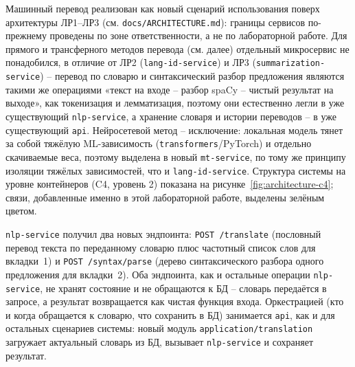 

Машинный перевод реализован как новый сценарий использования поверх
архитектуры ЛР1--ЛР3 (см. \texttt{docs/ARCHITECTURE.md}): границы
сервисов по-прежнему проведены по зоне ответственности, а не по
лабораторной работе. Для прямого и трансферного методов перевода (см.
далее) отдельный микросервис не понадобился, в отличие от ЛР2
(\texttt{lang-id-service}) и ЛР3 (\texttt{summarization-service}) --
перевод по словарю и синтаксический разбор предложения являются такими
же операциями «текст на входе -- разбор spaCy -- чистый результат на
выходе», как токенизация и лемматизация, поэтому они естественно легли
в уже существующий \texttt{nlp-service}, а хранение словаря и истории
переводов -- в уже существующий \texttt{api}. Нейросетевой метод --
исключение: локальная модель тянет за собой тяжёлую ML-зависимость
(\texttt{transformers}/PyTorch) и отдельно скачиваемые веса, поэтому
выделена в новый \texttt{mt-service}, по тому же принципу изоляции
тяжёлых зависимостей, что и \texttt{lang-id-service}. Структура системы
на уровне контейнеров (C4, уровень 2) показана на
рисунке~\ref{fig:architecture-c4}; связи, добавленные именно в этой
лабораторной работе, выделены зелёным цветом.


\texttt{nlp-service} получил два новых эндпоинта: \texttt{POST
/translate} (пословный перевод текста по переданному словарю плюс
частотный список слов для вкладки~1) и \texttt{POST /syntax/parse}
(дерево синтаксического разбора одного предложения для вкладки~2).
Оба эндпоинта, как и остальные операции \texttt{nlp-service}, не
хранят состояние и не обращаются к БД -- словарь передаётся в запросе,
а результат возвращается как чистая функция входа. Оркестрацией (кто
и когда обращается к словарю, что сохранить в БД) занимается
\texttt{api}, как и для остальных сценариев системы: новый модуль
\texttt{application/translation} загружает актуальный словарь из
БД, вызывает \texttt{nlp-service} и сохраняет результат.

